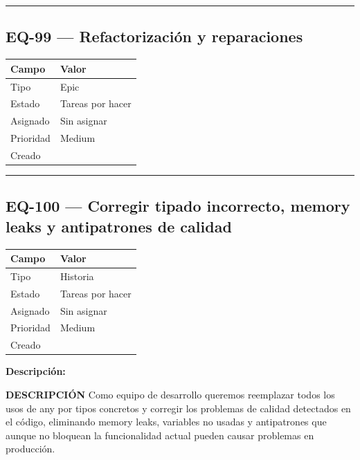 \documentclass[
  spanish,
  11pt,
]{report}
\newcounter{none} %
\begin{document}
\begin{center}\rule{0.5\linewidth}{0.5pt}\end{center}

\subsection{EQ-99 --- Refactorización y
reparaciones}\label{eq-99-refactorizaciuxf3n-y-reparaciones}

{\def\LTcaptype{none} %
\begin{longtable}[]{@{}ll@{}}
\toprule\noalign{}
Campo & Valor \\
\midrule\noalign{}
\endhead
\bottomrule\noalign{}
\endlastfoot
Tipo & Epic \\
Estado & Tareas por hacer \\
Asignado & Sin asignar \\
Prioridad & Medium \\
Creado & \\
\end{longtable}
}

\begin{center}\rule{0.5\linewidth}{0.5pt}\end{center}

\subsection{EQ-100 --- Corregir tipado incorrecto, memory leaks y
antipatrones de
calidad}\label{eq-100-corregir-tipado-incorrecto-memory-leaks-y-antipatrones-de-calidad}

{\def\LTcaptype{none} %
\begin{longtable}[]{@{}ll@{}}
\toprule\noalign{}
Campo & Valor \\
\midrule\noalign{}
\endhead
\bottomrule\noalign{}
\endlastfoot
Tipo & Historia \\
Estado & Tareas por hacer \\
Asignado & Sin asignar \\
Prioridad & Medium \\
Creado & \\
\end{longtable}
}

\textbf{Descripción:}

\textbf{DESCRIPCIÓN} Como equipo de desarrollo queremos reemplazar todos
los usos de any por tipos concretos y corregir los problemas de calidad
detectados en el código, eliminando memory leaks, variables no usadas y
antipatrones que aunque no bloquean la funcionalidad actual pueden
causar problemas en producción.
\end{document}
